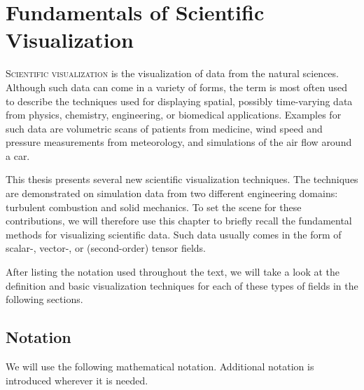 \chapter{Fundamentals of Scientific Visualization} %
\label{cha:fundamentals}
%
\lettrine[lines=3, findent=-2pt, nindent=5pt, loversize=0.02]{S}{cientific
visualization} is the visualization of data from the natural sciences.
%
Although such data can come in a variety of forms, the term is most often used
to describe the techniques used for displaying spatial, possibly time-varying
data from physics, chemistry, engineering, or biomedical applications.
%
Examples for such data are volumetric scans of patients from medicine, wind
speed and pressure measurements from meteorology, and simulations of the air
flow around a car.
%

%
This thesis presents several new scientific visualization techniques.
%
The techniques are demonstrated on simulation data from two different
engineering domains: turbulent combustion and solid mechanics.
%
To set the scene for these contributions, we will therefore use this chapter to
briefly recall the fundamental methods for visualizing scientific data.
%
Such data usually comes in the form of scalar-, vector-, or (second-order)
tensor fields.
%

%
After listing the notation used throughout the text, we will take a look at the
definition and basic visualization techniques for each of these types of fields
in the following sections.
%

%
\section{Notation} %
\label{sec:notation}
%
We will use the following mathematical notation.
%
Additional notation is introduced wherever it is needed.
%




